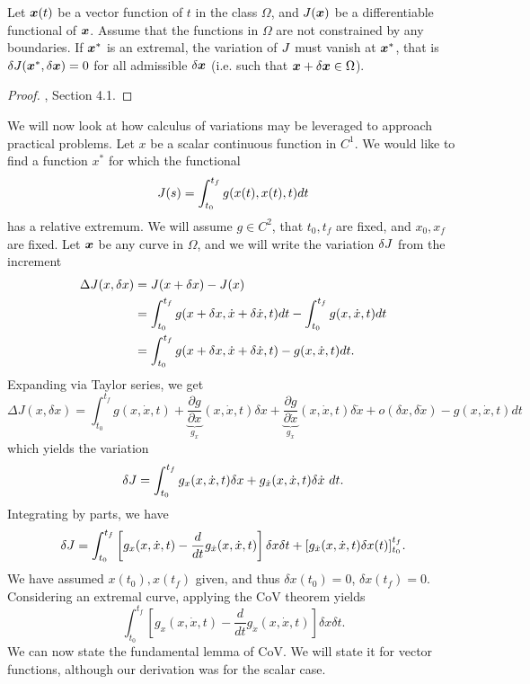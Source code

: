 \begin{theorem}
Let $\bm{x}(t)$ be a vector function of $t$ in the class $\Omega$, and $J(\bm{x})$ be a differentiable functional of $\bm{x}$. Assume that the functions in $\Omega$ are not constrained by any boundaries. If $\bm{x}^*$ is an extremal, the variation of $J$ must vanish at $\bm{x}^*$, that is $\delta J(\bm{x}^*, \delta \bm{x}) = 0$ for all admissible $\delta \bm{x}$ (i.e. such that $\bm{x} + \delta \bm{x} \in \Omega$).
\end{theorem}

\begin{proof}
\cite{kirk2012optimal}, Section 4.1.
\end{proof}

We will now look at how calculus of variations may be leveraged to approach practical problems. Let $x$ be a scalar continuous function in $C^1$. We would like to find a function $x^*$ for which the functional 
\begin{equation}
    J(s) = \int_{t_0}^{t_f} g(x(t),x(t),t) dt
\end{equation}
has a relative extremum. We will assume $g \in C^2$, that $t_0,t_f$ are fixed, and $x_0, x_f$ are fixed. Let $\bm{x}$ be any curve in $\Omega$, and we will write the variation $\delta J$ from the increment
\begin{align}
    \Delta J(x,\delta x) &= J(x + \delta x) - J(x)\\
    &= \int_{t_0}^{t_f} g(x + \delta x, \dot{x} + \delta \dot{x}, t) dt - \int_{t_0}^{t_f} g(x,\dot{x},t) dt\\
    &= \int_{t_0}^{t_f} g(x + \delta x, \dot{x} + \delta \dot{x}, t) - g(x,\dot{x},t) dt.
\end{align}
Expanding via Taylor series, we get
\begin{equation}
    \Delta J(x,\delta x) = \int_{t_0}^{t_f} g(x,\dot{x},t) + \underbrace{\frac{\partial g}{\partial x}}_{g_{x}} (x,\dot{x}, t) \delta x + \underbrace{\frac{\partial g}{\partial \dot{x}}}_{g_{\dot{x}}} (x,\dot{x}, t) \delta \dot{x} + o(\delta x, \delta \dot{x}) - g(x,\dot{x},t) dt
\end{equation}
which yields the variation
\begin{equation}
    \delta J = \int_{t_0}^{t_f} g_{x}(x,\dot{x},t) \delta x + g_{\dot{x}}(x,\dot{x},t)\delta \dot{x} \,\,dt.
\end{equation}
Integrating by parts, we have 
\begin{equation}
    \delta J = \int_{t_0}^{t_f} \left[ g_{x}(x,\dot{x},t) - \frac{d}{dt} g_{\dot{x}}(x,\dot{x},t)\right] \delta x \delta t + [g_{\dot{x}}(x,\dot{x},t)\delta x(t)]_{t_0}^{t_f}.
\end{equation}
We have assumed $x(t_0), x(t_f)$ given, and thus $\delta x(t_0) = 0$, $\delta x(t_f) = 0$. Considering an extremal curve, applying the CoV theorem yields
\begin{equation}
    \int_{t_0}^{t_f} \left[ g_{x}(x,\dot{x},t) - \frac{d}{dt} g_{\dot{x}}(x,\dot{x},t)\right] \delta x \delta t.
    \label{eq:euler_int}
\end{equation}
We can now state the fundamental lemma of CoV. We will state it for vector functions, although our derivation was for the scalar case. 

